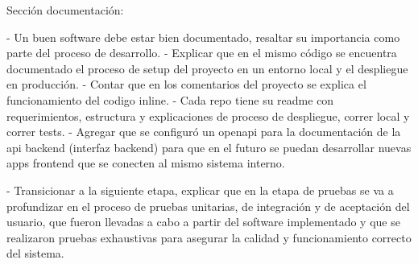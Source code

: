 Sección documentación:

- Un buen software debe estar bien documentado, resaltar su importancia como parte del proceso de desarrollo.
- Explicar que en el mismo código se encuentra documentado el proceso de setup del proyecto en un entorno local y el despliegue en producción.
- Contar que en los comentarios del proyecto se explica el funcionamiento del codigo inline. 
- Cada repo tiene su readme con requerimientos, estructura y explicaciones de proceso de despliegue, correr local y correr tests.
- Agregar que se configuró un openapi para la documentación de la api backend (interfaz backend) para que en el futuro se puedan desarrollar nuevas apps frontend que se conecten al mismo sistema interno. 

- Transicionar a la siguiente etapa, explicar que en la etapa de pruebas se va a profundizar en el proceso de pruebas unitarias, de integración y de aceptación del usuario, que fueron llevadas a cabo a partir del software implementado y que se realizaron pruebas exhaustivas para asegurar la calidad y funcionamiento correcto del sistema.
